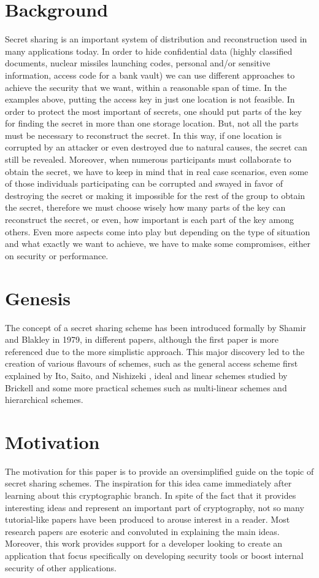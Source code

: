\documentclass[12pt, a4paper, oneside]{book}
\begin{document}
    \section{Background} 
    Secret sharing is an important system of distribution and reconstruction used in many applications today. In order to hide confidential data (highly classified documents, nuclear missiles launching codes, personal and/or sensitive information, access code for a bank vault) we can use different approaches to achieve the security that we want, within a reasonable span of time. In the examples above, putting the access key in just one location is not feasible. In order to protect the most important of secrets, one should put parts of the key for finding the secret in more than one storage location. But, not all the parts must be necessary to reconstruct the secret. In this way, if one location is corrupted by an attacker or even destroyed due to natural causes, the secret can still be revealed. Moreover, when numerous participants must collaborate to obtain the secret, we have to keep in mind that in real case scenarios, even some of those individuals participating can be corrupted and swayed in favor of destroying the secret or making it impossible for the rest of the group to obtain the secret, therefore we must choose wisely how many parts of the key can reconstruct the secret, or even, how important is each part of the key among others. Even more aspects come into play but depending on the type of situation and what exactly we want to achieve, we have to make some compromises, either on security or performance.
    \\
    \section{Genesis} 
    The concept of a secret sharing scheme has been introduced formally by Shamir \cite{ShareASecret} and Blakley \cite{ShareASecret_Blackley} in 1979, in different papers, although the first paper is more referenced due to the more simplistic approach. This major discovery led to the creation of various flavours of schemes, such as the general access scheme first explained by Ito, Saito, and Nishizeki \cite{GeneralSSS}, ideal and linear schemes studied by Brickell \cite{IdealSSS} and some more practical schemes such as multi-linear schemes and hierarchical schemes. 
    \\
    \section{Motivation}
    The motivation for this paper is to provide an oversimplified guide on the topic of secret sharing schemes. The inspiration for this idea came immediately after learning about this cryptographic branch. In spite of the fact that it provides interesting ideas and represent an important part of cryptography, not so many tutorial-like papers have been produced to arouse interest in a reader. Most research papers are esoteric and convoluted in explaining the main ideas. Moreover, this work provides support for a developer looking to create an application that focus specifically on developing security tools or boost internal security of other applications.
    \\
\end{document}
